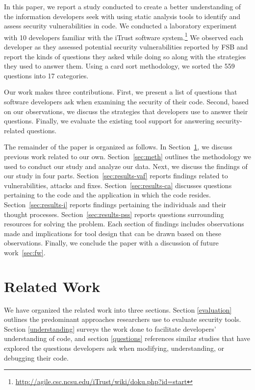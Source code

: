 \documentclass[conference]{IEEEtran}
\begin{document}
In this paper, we report a study conducted to create a better understanding of the information developers seek with using static analysis tools to identify and assess security vulnerabilities in code.
We conducted a laboratory experiment with 10 developers familiar with the iTrust software system.\footnote{\url{http://agile.csc.ncsu.edu/iTrust/wiki/doku.php?id=start}} 
We observed each developer as they assessed potential security vulnerabilities reported by FSB and report the kinds of questions they asked while doing so along with the strategies they used to answer them.
Using a card sort methodology, we sorted the 559 questions into 17 categories. 

Our work makes three contributions. 
First, we present a list of questions that software developers ask when examining the security of their code.
Second, based on our observations, we discuss the strategies that developers use to answer their questions.
Finally, we evaluate the existing tool support for answering security-related questions.

The remainder of the paper is organized as follows. 
In Section~\ref{sec:rw}, we discuss previous work related to our own. 
Section~\ref{sec:meth} outlines the methodology we used to conduct our study and analyze our data. 
Next, we discuss the findings of our study in four parts. 
Section~\ref{sec:results-vaf} reports findings related to vulnerabilities, attacks and fixes. 
Section~\ref{sec:results-ca} discusses questions pertaining to the code and the application in which the code resides.
Section~\ref{sec:results-i} reports findings pertaining the individuals and their thought processes.
Section~\ref{sec:results-pss} reports questions surrounding resources for solving the problem.
Each section of findings includes observations made and implications for tool design that can be drawn based on these observations. 
Finally, we conclude the paper with a discussion of future work~\ref{sec:fw}.







\section{Related Work}
\label{sec:rw}

We have organized the related work into three sections. Section \ref{evaluation} outlines the predominant approaches researchers use to evaluate security tools. 
Section \ref{understanding} surveys the work done to facilitate developers' understanding of code, and section \ref{questions} references similar studies that have explored the questions developers ask when modifying, understanding, or debugging their code.
\end{document}
